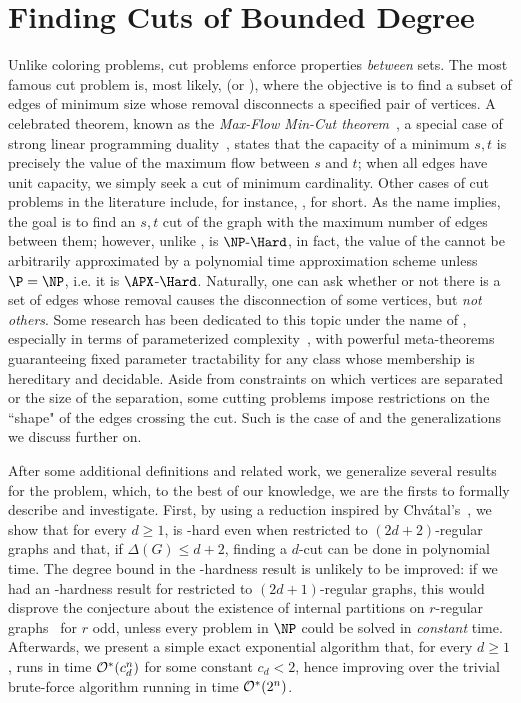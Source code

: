 \chapter{Finding Cuts of Bounded Degree}
\label{ch:cuts}
Unlike coloring problems, cut problems enforce properties \textit{between} sets.
The most famous cut problem is, most likely,  (or ), where the objective is to find a subset of edges of minimum size whose removal disconnects a specified pair of vertices.
A celebrated theorem, known as the \textit{Max-Flow Min-Cut theorem}~\citep{ford_fulkerson}, a special case of strong linear programming duality~\citep{linear_optimization}, states that the capacity of a minimum $s,t$ is precisely the value of the maximum flow between $s$ and $t$; when all edges have unit capacity, we simply seek a cut of minimum cardinality.
Other cases of cut problems in the literature include, for instance, ,  for short.
As the name implies, the goal is to find an $s,t$ cut of the graph with the maximum number of edges between them; however, unlike ,  is $\NPH$, in fact, the value of the cannot be arbitrarily approximated by a polynomial time approximation scheme unless $\P = \NP$, i.e. it is $\APX$-$\Hard$.
Naturally, one can ask whether or not there is a set of edges whose removal causes the disconnection of some vertices, but \textit{not others}.
Some research has been dedicated to this topic under the name of , especially in terms of parameterized complexity~\citep{marx_treewidth_reduction,marx_separation}, with powerful meta-theorems guaranteeing fixed parameter tractability for any class whose membership is hereditary and decidable.
Aside from constraints on which vertices are separated or the size of the separation, some cutting problems impose restrictions on the ``shape" of the edges crossing the cut.
Such is the case of  and the generalizations we discuss further on.

After some additional definitions and related work, we generalize several results for the  problem, which, to the best of our knowledge, we are the firsts to formally describe and investigate.
First, by using a reduction inspired by Chvátal's~\citep{chvatal_matching_cut}, we show that for every $d \geq 1$,  is \NP-hard even when restricted to $(2d+2)$-regular graphs and that, if $\Delta(G) \leq d+2$, finding a $d$-cut can be done in polynomial time. The degree bound in the \NP-hardness result is unlikely to be improved: if we had an \NP-hardness result for  restricted to $(2d+1)$-regular graphs, this would disprove the conjecture about the existence of internal partitions on $r$-regular graphs~\citep{DeVos09,internal_partition_regular6,internal_partition_regular3_4} for $r$ odd, unless every problem in $\NP$ could be solved in \textit{constant} time.
Afterwards, we present a simple exact exponential algorithm that, for every $d \geq 1$, runs in time $\mathcal{O}^*\!\left(c_d^n\right)$ for some constant $c_d < 2$, hence improving over the trivial brute-force algorithm running in time $\mathcal{O}^*\!\left(2^n\right)$.

